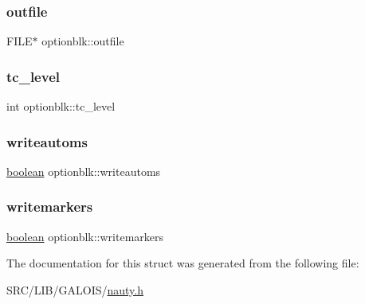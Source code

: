 \subsubsection{\texorpdfstring{outfile}{outfile}}
{\footnotesize\ttfamily F\+I\+LE$\ast$ optionblk\+::outfile}

\mbox{\label{structoptionblk_a544beb8407bc4cc875d4aa05986741f6}} 
\subsubsection{\texorpdfstring{tc\+\_\+level}{tc\_level}}
{\footnotesize\ttfamily int optionblk\+::tc\+\_\+level}

\mbox{\label{structoptionblk_ae62f3afc72cb10357a4db7d821e25d34}} 
\subsubsection{\texorpdfstring{writeautoms}{writeautoms}}
{\footnotesize\ttfamily \mbox{\hyperlink{nauty_8h_a621c38f1f10a1c565d897e3178b16d6e}{boolean}} optionblk\+::writeautoms}

\mbox{\label{structoptionblk_a4d502a0fedb648a1748971c782de26e5}} 
\subsubsection{\texorpdfstring{writemarkers}{writemarkers}}
{\footnotesize\ttfamily \mbox{\hyperlink{nauty_8h_a621c38f1f10a1c565d897e3178b16d6e}{boolean}} optionblk\+::writemarkers}



The documentation for this struct was generated from the following file\+:\begin{DoxyCompactItemize}
\item 
S\+R\+C/\+L\+I\+B/\+G\+A\+L\+O\+I\+S/\mbox{\hyperlink{nauty_8h}{nauty.\+h}}\end{DoxyCompactItemize}
